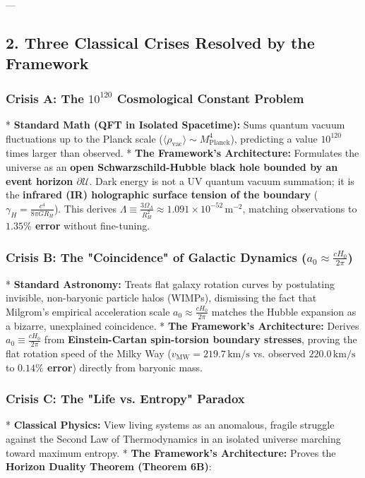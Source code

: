 \documentclass[11pt,a4paper]{article}
\theoremstyle{definition}
\theoremstyle{remark}
\begin{document}
---

\subsection{2. Three Classical Crises Resolved by the Framework}

\subsubsection{Crisis A: The $10^{120}$ Cosmological Constant Problem}
* \textbf{Standard Math (QFT in Isolated Spacetime):} Sums quantum vacuum fluctuations up to the Planck scale ($\langle \rho_{\text{vac}} \rangle \sim M_{\text{Planck}}^4$), predicting a value $10^{120}$ times larger than observed.
* \textbf{The Framework's Architecture:} Formulates the universe as an \textbf{open Schwarzschild-Hubble black hole bounded by an event horizon $\partial\mathcal{U}$}. Dark energy is not a UV quantum vacuum summation; it is the \textbf{infrared (IR) holographic surface tension of the boundary} ($\gamma_H = \frac{c^4}{8\pi G R_H}$).  
  This derives $\Lambda \equiv \frac{3\Omega_\Lambda}{R_H^2} \approx 1.091 \times 10^{-52} \, \mathrm{m^{-2}}$, matching observations to \textbf{$1.35\%$ error} without fine-tuning.

\subsubsection{Crisis B: The "Coincidence" of Galactic Dynamics ($a_0 \approx \frac{c H_0}{2\pi}$)}
* \textbf{Standard Astronomy:} Treats flat galaxy rotation curves by postulating invisible, non-baryonic particle halos (WIMPs), dismissing the fact that Milgrom's empirical acceleration scale $a_0 \approx \frac{c H_0}{2\pi}$ matches the Hubble expansion as a bizarre, unexplained coincidence.
* \textbf{The Framework's Architecture:} Derives $a_0 \equiv \frac{c H_0}{2\pi}$ from \textbf{Einstein-Cartan spin-torsion boundary stresses}, proving the flat rotation speed of the Milky Way ($v_{\text{MW}} = 219.7 \, \mathrm{km/s}$ vs. observed $220.0 \, \mathrm{km/s}$ to \textbf{$0.14\%$ error}) directly from baryonic mass.

\subsubsection{Crisis C: The "Life vs. Entropy" Paradox}
* \textbf{Classical Physics:} View living systems as an anomalous, fragile struggle against the Second Law of Thermodynamics in an isolated universe marching toward maximum entropy.
* \textbf{The Framework's Architecture:} Proves the \textbf{Horizon Duality Theorem (Theorem 6B)}:
  
\end{document}

